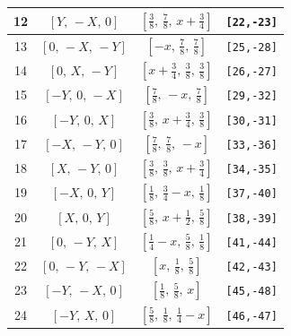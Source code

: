 \documentclass[fleqn,8pt]{jsarticle}
\begin{document}
\begin{longtable}{cccc}
12 & $\left[ Y,\, - X,\, 0 \right]$ & $\left[ \frac{3}{8},\, \frac{7}{8},\, x + \frac{3}{4} \right]$ & {\tt [22,-23]} \\ \hline
13 & $\left[ 0,\, - X,\, - Y \right]$ & $\left[ - x,\, \frac{7}{8},\, \frac{7}{8} \right]$ & {\tt [25,-28]} \\ \hline
14 & $\left[ 0,\, X,\, - Y \right]$ & $\left[ x + \frac{3}{4},\, \frac{3}{8},\, \frac{3}{8} \right]$ & {\tt [26,-27]} \\ \hline
15 & $\left[ - Y,\, 0,\, - X \right]$ & $\left[ \frac{7}{8},\, - x,\, \frac{7}{8} \right]$ & {\tt [29,-32]} \\ \hline
16 & $\left[ - Y,\, 0,\, X \right]$ & $\left[ \frac{3}{8},\, x + \frac{3}{4},\, \frac{3}{8} \right]$ & {\tt [30,-31]} \\ \hline
17 & $\left[ - X,\, - Y,\, 0 \right]$ & $\left[ \frac{7}{8},\, \frac{7}{8},\, - x \right]$ & {\tt [33,-36]} \\ \hline
18 & $\left[ X,\, - Y,\, 0 \right]$ & $\left[ \frac{3}{8},\, \frac{3}{8},\, x + \frac{3}{4} \right]$ & {\tt [34,-35]} \\ \hline
19 & $\left[ - X,\, 0,\, Y \right]$ & $\left[ \frac{1}{8},\, \frac{3}{4} - x,\, \frac{1}{8} \right]$ & {\tt [37,-40]} \\ \hline
20 & $\left[ X,\, 0,\, Y \right]$ & $\left[ \frac{5}{8},\, x + \frac{1}{2},\, \frac{5}{8} \right]$ & {\tt [38,-39]} \\ \hline
21 & $\left[ 0,\, - Y,\, X \right]$ & $\left[ \frac{1}{4} - x,\, \frac{5}{8},\, \frac{1}{8} \right]$ & {\tt [41,-44]} \\ \hline
22 & $\left[ 0,\, - Y,\, - X \right]$ & $\left[ x,\, \frac{1}{8},\, \frac{5}{8} \right]$ & {\tt [42,-43]} \\ \hline
23 & $\left[ - Y,\, - X,\, 0 \right]$ & $\left[ \frac{1}{8},\, \frac{5}{8},\, x \right]$ & {\tt [45,-48]} \\ \hline
24 & $\left[ - Y,\, X,\, 0 \right]$ & $\left[ \frac{5}{8},\, \frac{1}{8},\, \frac{1}{4} - x \right]$ & {\tt [46,-47]} \\
\end{longtable}
\renewcommand{\arraystretch}{1.2}
\end{document}
